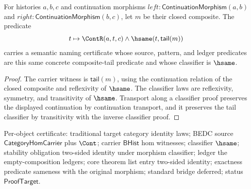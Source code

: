 \begin{theorem}
\label{thm:category-continuation-morphism-composite-tail-semantic-namecert}
For histories $a,b,c$ and continuation morphisms
$left:\mathsf{ContinuationMorphism}(a,b)$ and
$right:\mathsf{ContinuationMorphism}(b,c)$, let $m$ be their closed composite.
The predicate
$$
t\mapsto \ContR(a,t,c)\land \hsame(t,\mathsf{tail}(m))
$$
carries a semantic naming certificate whose source, pattern, and ledger
predicates are this same concrete composite-tail predicate and whose classifier
is $\hsame$.
\end{theorem}
\begin{proof}
The carrier witness is $\mathsf{tail}(m)$, using the continuation relation of
the closed composite and reflexivity of $\hsame$. The classifier laws are
reflexivity, symmetry, and transitivity of $\hsame$. Transport along a
classifier proof preserves the displayed continuation by continuation transport,
and it preserves the tail classifier by transitivity with the inverse
classifier proof.
\end{proof}

Per-object certificate: traditional target category identity laws; BEDC source $\mathsf{CategoryHomCarrier}$ plus $\Cont$; carrier $\mathsf{BHist}$ hom witnesses; classifier $\hsame$; stability obligation two-sided identity under morphism classifier; ledger the empty-composition ledgers; core theorem list entry two-sided identity; exactness predicate sameness with the original morphism; standard bridge deferred; status $\mathsf{ProofTarget}$.


